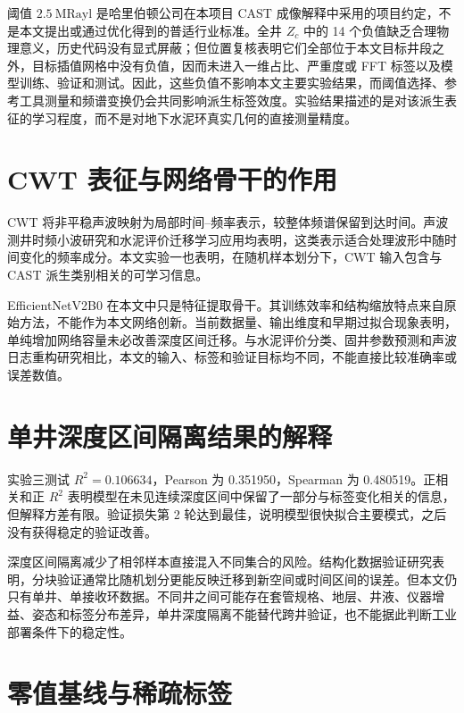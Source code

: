 阈值 $2.5~\mathrm{MRayl}$ 是哈里伯顿公司在本项目 CAST 成像解释中采用的项目约定，不是本文提出或通过优化得到的普适行业标准。全井 $Z_c$ 中的 14 个负值缺乏合理物理意义，历史代码没有显式屏蔽；但位置复核表明它们全部位于本文目标井段之外，目标插值网格中没有负值，因而未进入一维占比、严重度或 FFT 标签以及模型训练、验证和测试。因此，这些负值不影响本文主要实验结果，而阈值选择、参考工具测量和频谱变换仍会共同影响派生标签效度。实验结果描述的是对该派生表征的学习程度，而不是对地下水泥环真实几何的直接测量精度。

\section{CWT 表征与网络骨干的作用}

CWT 将非平稳声波映射为局部时间--频率表示，较整体频谱保留到达时间。声波测井时频小波研究和水泥评价迁移学习应用均表明，这类表示适合处理波形中随时间变化的频率成分\cite{Saito1997WaveletAcoustic,Abdollahian2024TransferCement}。本文实验一也表明，在随机样本划分下，CWT 输入包含与 CAST 派生类别相关的可学习信息。

EfficientNetV2B0 在本文中只是特征提取骨干。其训练效率和结构缩放特点来自原始方法\cite{Tan2021EfficientNetV2}，不能作为本文网络创新。当前数据量、输出维度和早期过拟合现象表明，单纯增加网络容量未必改善深度区间迁移。与水泥评价分类、固井参数预测和声波日志重构研究相比\cite{Viggen2020AutomaticCement,Liu2025WideDeepCement,Wang2023ExplainableSonic}，本文的输入、标签和验证目标均不同，不能直接比较准确率或误差数值。

\section{单井深度区间隔离结果的解释}

实验三测试 $R^2=0.106634$，Pearson 为 0.351950，Spearman 为 0.480519。正相关和正 $R^2$ 表明模型在未见连续深度区间中保留了一部分与标签变化相关的信息，但解释方差有限。验证损失第 2 轮达到最佳，说明模型很快拟合主要模式，之后没有获得稳定的验证改善。

深度区间隔离减少了相邻样本直接混入不同集合的风险。结构化数据验证研究表明，分块验证通常比随机划分更能反映迁移到新空间或时间区间的误差\cite{Roberts2017CrossValidation,Ploton2020SpatialValidation}。但本文仍只有单井、单接收环数据。不同井之间可能存在套管规格、地层、井液、仪器增益、姿态和标签分布差异，单井深度隔离不能替代跨井验证，也不能据此判断工业部署条件下的稳定性。

\section{零值基线与稀疏标签}

